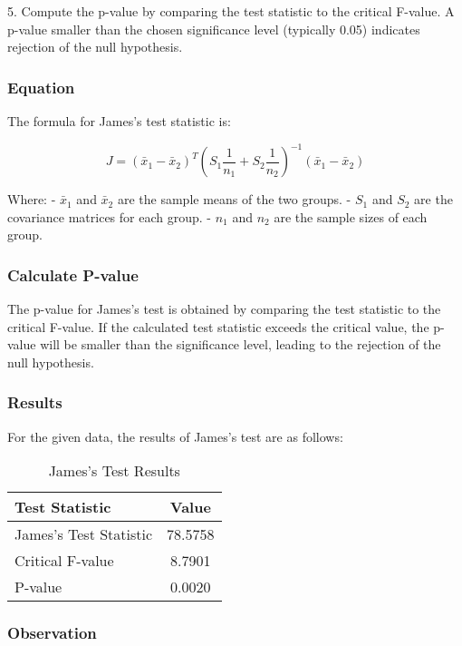 \documentclass[11pt]{article}
\begin{document}
5. Compute the p-value by comparing the test statistic to the critical F-value. A p-value smaller than the chosen significance level (typically 0.05) indicates rejection of the null hypothesis.

\subsubsection{Equation}

The formula for James’s test statistic is:

\[
J = (\bar{x}_1 - \bar{x}_2)^T \left( S_1 \frac{1}{n_1} + S_2 \frac{1}{n_2} \right)^{-1} (\bar{x}_1 - \bar{x}_2)
\]

Where:
- \( \bar{x}_1 \) and \( \bar{x}_2 \) are the sample means of the two groups.
- \( S_1 \) and \( S_2 \) are the covariance matrices for each group.
- \( n_1 \) and \( n_2 \) are the sample sizes of each group.

\subsubsection{Calculate P-value}

The p-value for James's test is obtained by comparing the test statistic to the critical F-value. If the calculated test statistic exceeds the critical value, the p-value will be smaller than the significance level, leading to the rejection of the null hypothesis.

\subsubsection{Results}

For the given data, the results of James's test are as follows:

\begin{table}[h!]
\centering
\begin{tabular}{|l|c|}
    \hline
    \textbf{Test Statistic} & \textbf{Value} \\
    \hline
    James's Test Statistic & 78.5758 \\
    \hline
    Critical F-value & 8.7901 \\
    \hline
    P-value & 0.0020 \\
    \hline
\end{tabular}
\caption{James's Test Results}
\end{table}

\subsubsection{Observation}
\end{document}
